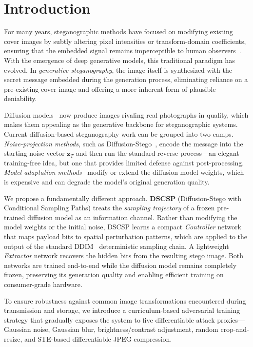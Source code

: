 \documentclass[conference]{IEEEtran}
\begin{document}
\section{Introduction}
\label{sec:intro}

For many years, steganographic methods have focused on modifying existing cover images by subtly altering pixel intensities or transform-domain coefficients, ensuring that the embedded signal remains imperceptible to human observers~\cite{cox2007digital}.
With the emergence of deep generative models, this traditional paradigm has evolved.
In \emph{generative steganography}, the image itself is synthesized with the secret message embedded during the generation process, eliminating reliance on a pre-existing cover image and offering a more inherent form of plausible deniability.


Diffusion models~\cite{ho2020denoising, song2020denoising} now produce images rivaling real photographs in quality, which makes them appealing as the generative backbone for steganographic systems.
Current diffusion-based steganography work can be grouped into two camps.
\emph{Noise-projection methods}, such as Diffusion-Stego~\cite{wei2023diffusionstego}, encode the message into the starting noise vector $\mathbf{z}_T$ and then run the standard reverse process---an elegant training-free idea, but one that provides limited defense against post-processing.
\emph{Model-adaptation methods}~\cite{peng2023stegodiffusion, zhang2024ldstega} modify or extend the diffusion model weights, which is expensive and can degrade the model's original generation quality.

We propose a fundamentally different approach.
\textbf{DSCSP} (Diffusion-Stego with Conditional Sampling Paths) treats the \emph{sampling trajectory} of a frozen pre-trained diffusion model as an information channel.
Rather than modifying the model weights or the initial noise, DSCSP learns a compact \emph{Controller} network that maps payload bits to spatial perturbation patterns, which are applied to the output of the standard DDIM~\cite{song2020denoising} deterministic sampling chain.
A lightweight \emph{Extractor} network recovers the hidden bits from the resulting stego image.
Both networks are trained end-to-end while the diffusion model remains completely frozen, preserving its generation quality and enabling efficient training on consumer-grade hardware.

To ensure robustness against common image transformations encountered during transmission and storage, we introduce a curriculum-based adversarial training strategy that gradually exposes the system to five differentiable attack proxies---Gaussian noise, Gaussian blur, brightness/contrast adjustment, random crop-and-resize, and STE-based differentiable JPEG compression.
\end{document}
